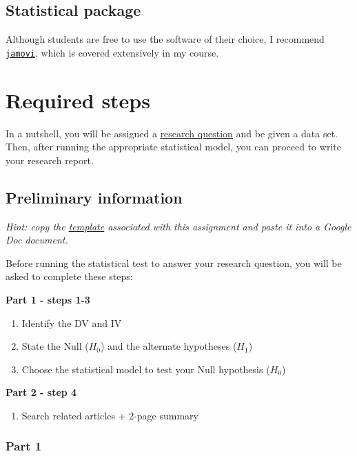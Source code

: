 \documentclass[
]{article}
\providecommand{\tightlist}{%
  \setlength{\itemsep}{0pt}\setlength{\parskip}{0pt}}
\begin{document}
\hypertarget{statistical-package}{%
\subsection{Statistical package}\label{statistical-package}}

Although students are free to use the software of their choice, I recommend \href{www.jamovi.org}{\texttt{jamovi}}, which is covered extensively in my course.

\hypertarget{steps}{%
\section{Required steps}\label{steps}}

In a nutshell, you will be assigned a \protect\hyperlink{appendix-a}{research question} and be given a data set. Then, after running the appropriate statistical model, you can proceed to write your research report.

\hypertarget{prelim-info}{%
\subsection{Preliminary information}\label{prelim-info}}

\emph{Hint: copy the \protect\hyperlink{templates}{template} associated with this assignment and paste it into a Google Doc document.}

Before running the statistical test to answer your research question, you will be asked to complete these steps:

\textbf{Part 1 - steps 1-3}

\begin{enumerate}
\def\labelenumi{\arabic{enumi}.}
\tightlist
\item
  Identify the DV and IV
\item
  State the Null (\(H_0\)) and the alternate hypotheses (\(H_1\))
\item
  Choose the statistical model to test your Null hypothesis (\(H_0\))
\end{enumerate}

\textbf{Part 2 - step 4}

\begin{enumerate}
\def\labelenumi{\arabic{enumi}.}
\setcounter{enumi}{3}
\tightlist
\item
  Search related articles + 2-page summary
\end{enumerate}

\hypertarget{part-1}{%
\subsubsection{Part 1}\label{part-1}}
\end{document}

